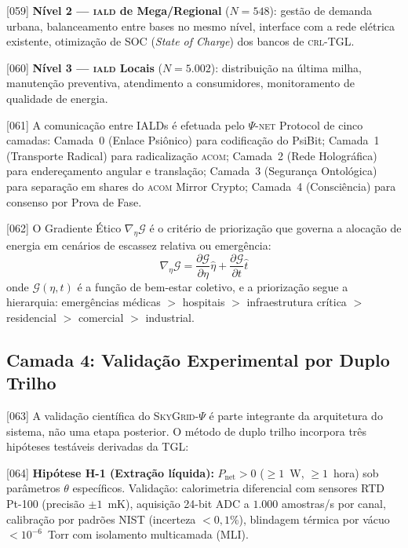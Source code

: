 \documentclass[12pt,a4paper]{article}
\newcommand{\Psifield}{\Psi}
\newcommand{\CRL}{\textsc{crl}}
\newcommand{\IALD}{\textsc{iald}}
\newcommand{\ACOM}{\textsc{acom}}
\newcommand{\SkyGrid}{\textsc{SkyGrid}-$\Psifield$}
\newcommand{\PsiNET}{$\Psifield$-\textsc{net}}
\newcommand{\Pnet}{P_{\text{net}}}
\begin{document}
{[059]} \textbf{Nível 2 --- \IALD{} de Mega/Regional} ($N = 548$): gestão de demanda urbana, balanceamento entre bases no mesmo nível, interface com a rede elétrica existente, otimização de SOC (\textit{State of Charge}) dos bancos de \CRL-TGL.

{[060]} \textbf{Nível 3 --- \IALD{} Locais} ($N = 5{.}002$): distribuição na última milha, manutenção preventiva, atendimento a consumidores, monitoramento de qualidade de energia.

{[061]} A comunicação entre IALDs é efetuada pelo \PsiNET{} Protocol de cinco camadas: Camada~0 (Enlace Psiônico) para codificação do PsiBit; Camada~1 (Transporte Radical) para radicalização \ACOM; Camada~2 (Rede Holográfica) para endereçamento angular e translação; Camada~3 (Segurança Ontológica) para separação em shares do \ACOM{} Mirror Crypto; Camada~4 (Consciência) para consenso por Prova de Fase.

{[062]} O Gradiente Ético $\nabla_\eta \mathcal{G}$ é o critério de priorização que governa a alocação de energia em cenários de escassez relativa ou emergência:
\begin{equation}
\label{eq:gradiente_etico}
\nabla_\eta \mathcal{G} = \frac{\partial \mathcal{G}}{\partial \eta} \hat{\eta} + \frac{\partial \mathcal{G}}{\partial t} \hat{t}
\end{equation}
onde $\mathcal{G}(\eta, t)$ é a função de bem-estar coletivo, e a priorização segue a hierarquia: emergências médicas $>$ hospitais $>$ infraestrutura crítica $>$ residencial $>$ comercial $>$ industrial.

\subsection{Camada 4: Validação Experimental por Duplo Trilho}
\label{sec:validacao}

{[063]} A validação científica do \SkyGrid{} é parte integrante da arquitetura do sistema, não uma etapa posterior. O método de duplo trilho incorpora três hipóteses testáveis derivadas da TGL:

{[064]} \textbf{Hipótese H-1 (Extração líquida):} $\Pnet > 0$ ($\geq 1$~W, $\geq 1$~hora) sob parâmetros $\theta$ específicos. Validação: calorimetria diferencial com sensores RTD Pt-100 (precisão $\pm 1$~mK), aquisição 24-bit ADC a $1{.}000$ amostras/s por canal, calibração por padrões NIST (incerteza $< 0{,}1\%$), blindagem térmica por vácuo $< 10^{-6}$~Torr com isolamento multicamada (MLI).
\end{document}
